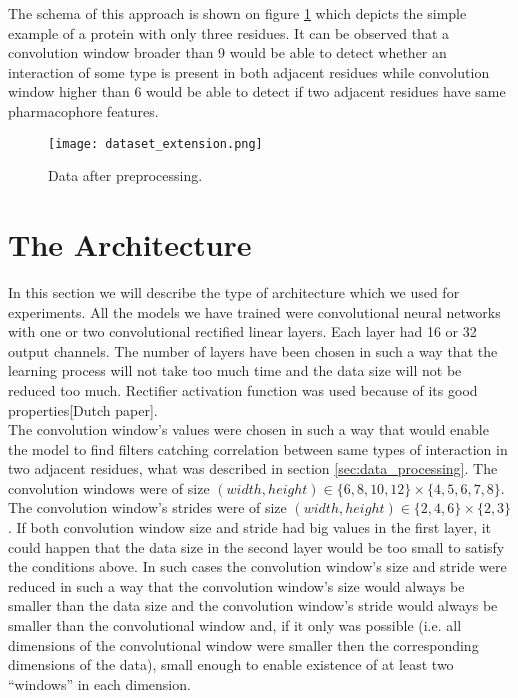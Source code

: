 \documentclass[a4paper,10pt]{report}
\begin{document}
	  The schema of this approach is shown on figure \ref{fig:extended_data} which depicts the simple example of a protein with only three residues. It can be observed that a convolution window broader than 9 would be able to detect whether an interaction of some type is present in both adjacent residues while convolution window higher than 6 would be able to detect if two adjacent residues have same pharmacophore features.\\
	  
	  \begin{figure}[h!]
	    \centering
	    \texttt{[image: dataset\_extension.png]}
	    \caption{Data after preprocessing.}
	    \label{fig:extended_data}
	  \end{figure} 
      
	
      \section{The Architecture}
      In this section we will describe the type of architecture which we used for experiments. All the models we have trained were convolutional neural networks with one or two convolutional rectified linear layers. Each layer had 16 or 32 output channels. The number of layers have been chosen in such a way that the learning process will not take too much time and the data size will not be reduced too much. Rectifier activation function was used because of its good properties[Dutch paper].\\ 
   
      The convolution window's values were chosen in such a way that would enable the model to find filters catching correlation between same types of interaction in two adjacent residues, what was described in section \ref{sec:data_processing}. The convolution windows were of size $(width, height) \in \{6, 8, 10, 12\} \times \{4, 5, 6, 7, 8\}$. The convolution window's strides were of size $(width, height) \in \{2, 4, 6\} \times \{2, 3\}$. If both convolution window size and stride had big values in the first layer, it could happen that the data size in the second layer would be too small to satisfy the conditions above. In such cases the convolution window's size and stride were reduced in such a way that the convolution window's size would always be smaller than the data size and the convolution window's stride would always be smaller than the convolutional window and, if it only was possible (i.e. all dimensions of the convolutional window were smaller then the corresponding dimensions of the data), small enough to enable existence of at least two ``windows'' in each dimension.\\
      
\end{document}
